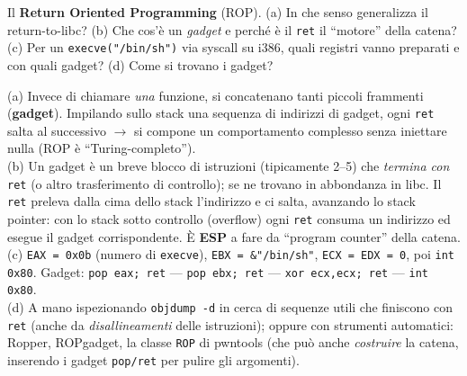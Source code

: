 \question[7]
Il \textbf{Return Oriented Programming} (ROP). (a) In che senso generalizza il return-to-libc? (b) Che cos'è un \emph{gadget} e perché è il \lstinline|ret| il ``motore'' della catena? (c) Per un \lstinline|execve("/bin/sh")| via syscall su i386, quali registri vanno preparati e con quali gadget? (d) Come si trovano i gadget?
\begin{solution}
(a) Invece di chiamare \emph{una} funzione, si concatenano tanti piccoli frammenti (\textbf{gadget}). Impilando sullo stack una sequenza di indirizzi di gadget, ogni \lstinline|ret| salta al successivo $\to$ si compone un comportamento complesso senza iniettare nulla (ROP è ``Turing-completo'').\\
(b) Un gadget è un breve blocco di istruzioni (tipicamente 2--5) che \emph{termina con} \lstinline|ret| (o altro trasferimento di controllo); se ne trovano in abbondanza in libc. Il \lstinline|ret| preleva dalla cima dello stack l'indirizzo e ci salta, avanzando lo stack pointer: con lo stack sotto controllo (overflow) ogni \lstinline|ret| consuma un indirizzo ed esegue il gadget corrispondente. È \textbf{ESP} a fare da ``program counter'' della catena.\\
(c) \lstinline|EAX = 0x0b| (numero di \lstinline|execve|), \lstinline|EBX = &"/bin/sh"|, \lstinline|ECX = EDX = 0|, poi \lstinline|int 0x80|. Gadget: \lstinline|pop eax; ret| --- \lstinline|pop ebx; ret| --- \lstinline|xor ecx,ecx; ret| --- \lstinline|int 0x80|.\\
(d) A mano ispezionando \lstinline|objdump -d| in cerca di sequenze utili che finiscono con \lstinline|ret| (anche da \emph{disallineamenti} delle istruzioni); oppure con strumenti automatici: Ropper, ROPgadget, la classe \lstinline|ROP| di pwntools (che può anche \emph{costruire} la catena, inserendo i gadget \lstinline|pop/ret| per pulire gli argomenti).
\end{solution}
